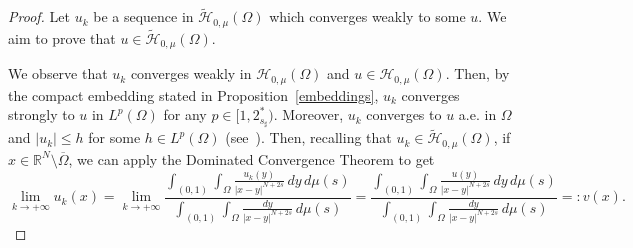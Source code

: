 \documentclass[12pt,a4paper,intlimits,sumlimits]{amsart}
\def \R {\mathbb{R}}
\theoremstyle{definition}
\theoremstyle{plain}
\numberwithin{equation}{section}
\renewcommand{\leq}{\leqslant}
\begin{document}
\begin{proof}
Let $u_k$ be a sequence in $\widetilde{\mathcal H}_{0, \mu}(\Omega)$ which converges weakly to some $u$. We aim to prove that $u\in \widetilde{\mathcal H}_{0, \mu}(\Omega)$.

We observe that $u_k$ converges weakly in ${\mathcal H}_{0, \mu}(\Omega)$ and $u\in{\mathcal H}_{0, \mu}(\Omega)$.
Then, by the compact embedding stated in Proposition~\ref{embeddings},
$u_k$ converges strongly to $u$ in $L^p(\Omega)$ for any 
$p\in [1,2^*_{s_{\sharp}})$. Moreover, $u_k$ converges to $u$ 
a.e. in $\Omega$ and $|u_k|\leq h$ for some $h\in L^p(\Omega)$
(see~\cite[Theorem~IV.9]{brezis}).
Then, recalling that $u_k\in \widetilde{\mathcal H}_{0, \mu}(\Omega)$, if $x\in\R^N\setminus \overline{\Omega}$,
we can apply the Dominated Convergence Theorem to get
\begin{equation}\label{vdefn}
\lim_{k\to +\infty}u_k(x)=
\lim_{k\to +\infty}
\dfrac{\displaystyle \int_{(0,1)}\int_\Omega \frac{u_k(y)}{|x-y|^{N+2s}}\,dy\,d\mu(s)}{\displaystyle \int_{(0,1)}\int_\Omega \frac{dy}{|x-y|^{N+2s}}\,d\mu(s)}
=
\dfrac{\displaystyle \int_{(0,1)}\int_\Omega \frac{u(y)}{|x-y|^{N+2s}}\,dy\,d\mu(s)}{\displaystyle \int_{(0,1)}\int_\Omega \frac{dy}{|x-y|^{N+2s}}\,d\mu(s)}=:v(x).
\end{equation}


\end{proof}
\end{document}
